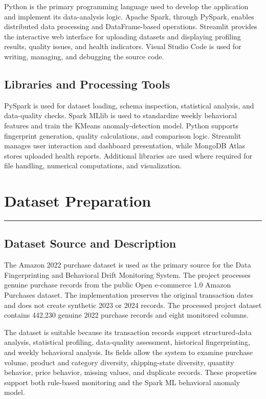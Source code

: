 \documentclass[12pt,a4paper]{report}
\begin{document}
Python is the primary programming language used to develop the application and implement its data-analysis logic. Apache Spark, through PySpark, enables distributed data processing and DataFrame-based operations. Streamlit provides the interactive web interface for uploading datasets and displaying profiling results, quality issues, and health indicators. Visual Studio Code is used for writing, managing, and debugging the source code.

\section{Libraries and Processing Tools}

PySpark is used for dataset loading, schema inspection, statistical analysis, and data-quality checks. Spark MLlib is used to standardize weekly behavioral features and train the KMeans anomaly-detection model. Python supports fingerprint generation, quality calculations, and comparison logic. Streamlit manages user interaction and dashboard presentation, while MongoDB Atlas stores uploaded health reports. Additional libraries are used where required for file handling, numerical computations, and visualization.






\chapter{Dataset Preparation}
\rule{\textwidth}{2pt}

\section{Dataset Source and Description}

The Amazon 2022 purchase dataset is used as the primary source for the Data Fingerprinting and Behavioral Drift Monitoring System. The project processes genuine purchase records from the public Open e-commerce 1.0 Amazon Purchases dataset. The implementation preserves the original transaction dates and does not create synthetic 2023 or 2024 records. The processed project dataset contains 442,230 genuine 2022 purchase records and eight monitored columns.

The dataset is suitable because its transaction records support structured-data analysis, statistical profiling, data-quality assessment, historical fingerprinting, and weekly behavioral analysis. Its fields allow the system to examine purchase volume, product and category diversity, shipping-state diversity, quantity behavior, price behavior, missing values, and duplicate records. These properties support both rule-based monitoring and the Spark ML behavioral anomaly model.
\end{document}
